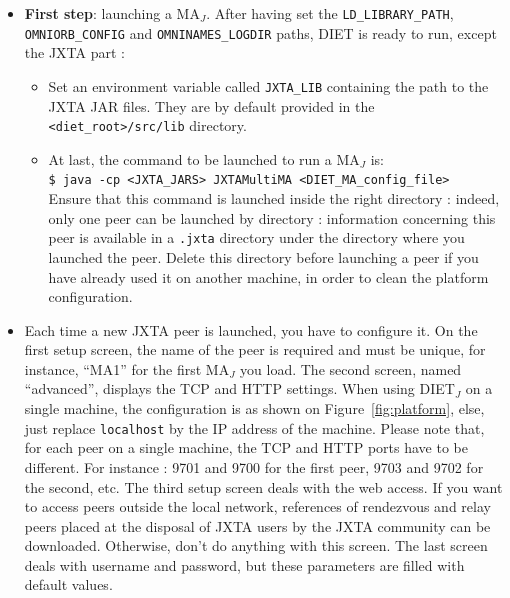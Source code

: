 \begin{itemize}

  \item{\textbf{First step}: launching a MA$_{J}$. After having set
      the \texttt{LD\_LIBRARY\_PATH}, \\ \texttt{OMNIORB\_CONFIG} and
      \texttt{OMNINAMES\_LOGDIR} paths, DIET is ready to run, except
      the JXTA part :}
    \begin{itemize}
      \item{Set an environment variable called \texttt{JXTA\_LIB}
      containing the path to the JXTA JAR files. They are by default
      provided in the \texttt{<diet\_root>/src/lib} directory.}

  \item{At last, the command to be launched to run a MA$_{J}$ is:\\
      \noindent
      {\footnotesize \texttt{\$ java -cp <JXTA\_JARS> JXTAMultiMA
          <DIET\_MA\_config\_file>} } \\Ensure that this command is
      launched inside the right directory : indeed, only one peer can
      be launched by directory : information concerning this peer is
      available in a \texttt{.jxta} directory under the directory
      where you launched the peer.  Delete this directory before
      launching a peer if you have already used it on another machine,
      in order to clean the platform configuration.}
    \end{itemize}
    
  \item{Each time a new JXTA peer is launched, you have to configure
      it.  On the first setup screen, the name of the peer is required
      and must be unique, for instance, ``MA1'' for the first MA$_{J}$
      you load. The second screen, named ``advanced'', displays the
      TCP and HTTP settings. When using DIET$_{J}$ on a single
      machine, the configuration is as shown on
      Figure~\ref{fig:platform}, else, just replace \texttt{localhost}
      by the IP address of the machine.  Please note that, for each
      peer on a single machine, the TCP and HTTP ports have to be
      different. For instance : 9701 and 9700 for the first peer, 9703
      and 9702 for the second, etc. The third setup screen deals with
      the web access. If you want to access peers outside the local
      network, references of rendezvous and relay peers placed at the
      disposal of JXTA users by the JXTA community can be
      downloaded. Otherwise, don't do anything with this screen. The
      last screen deals with username and password, but these
      parameters are filled with default values.}


\end{itemize}
